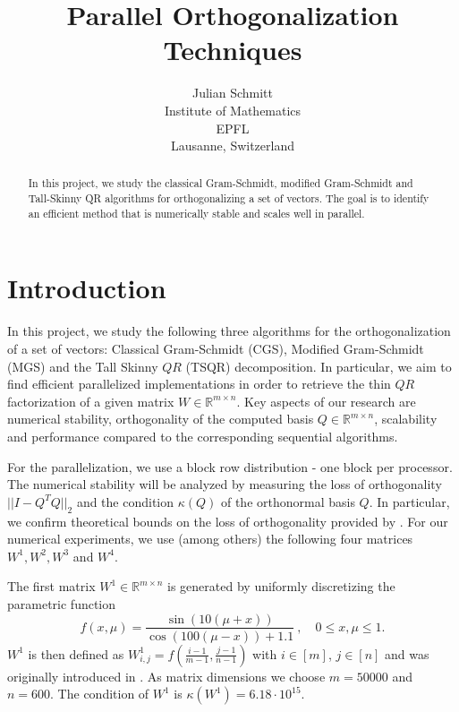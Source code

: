 \documentclass{article}
\title{Parallel Orthogonalization Techniques}
\author{%
  Julian Schmitt \\
  Institute of Mathematics \\
  EPFL \\
  Lausanne, Switzerland
}
\begin{document}
\maketitle


\begin{abstract}
    In this project, we study the classical Gram-Schmidt, modified Gram-Schmidt
    and Tall-Skinny QR algorithms for orthogonalizing a set of vectors. The goal
    is to identify an efficient method that is numerically stable and scales
    well in parallel.
\end{abstract}


\section{Introduction}
In this project, we study the following three algorithms for the
orthogonalization of a set of vectors: Classical Gram-Schmidt (CGS), Modified
Gram-Schmidt (MGS) and the Tall Skinny $QR$ (TSQR) decomposition. In particular,
we aim to find efficient parallelized implementations in order to retrieve the
thin $QR$ factorization of a given matrix $W \in \mathbb{R}^{m \times n}$. Key
aspects of our research are numerical stability, orthogonality of the computed
basis $Q \in \mathbb{R}^{m \times n}$, scalability and performance compared to
the corresponding sequential algorithms.

For the parallelization, we use a block row distribution - one block per
processor. The numerical stability will be analyzed by measuring the loss of
orthogonality $||I - Q^T Q||_2$ and the condition $\kappa(Q)$ of the
orthonormal basis $Q$. In particular, we confirm theoretical bounds on the loss
of orthogonality provided by \cite{Grigori:2023}. For our numerical experiments,
we use (among others) the following four matrices $W^1, W^2, W^3$ and $W^4$.

The first matrix $W^1 \in \mathbb{R}^{m \times n}$ is generated by uniformly
discretizing the parametric function
\begin{equation*}
    f(x, \mu) = \frac{\sin (10 (\mu + x))}{\cos (100 (\mu - x)) + 1.1} \ ,
    \quad 0 \leq x, \mu \leq 1.
\end{equation*}
$W^1$ is then defined as $W_{i,j}^1 = f(\frac{i - 1}{m - 1}, \frac{j - 1}{n -
1})$ with $i \in [m]$, $j \in [n]$ and was originally introduced in
\cite{BalabanovGrigori:2022}. As matrix dimensions we choose $m = 50000$ and $n
= 600$. The condition of $W^1$ is $\kappa(W^1) = 6.18\cdot10^{15}$.
\end{document}

